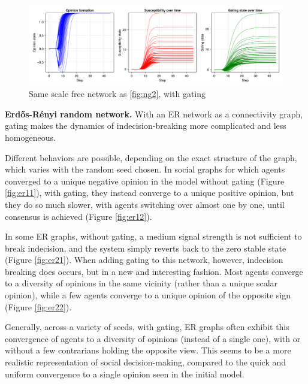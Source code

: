 \documentclass[]{article}
\begin{document}
\begin{figure}
	\centering
	\includegraphics[width=0.75\linewidth]{../plots/nvar0_wg_homd_hisig_g05_BA3_a2_taux5_s92391}
	\caption{Same scale free network as \ref{fig:ng2}, with gating}
	\label{fig:ba}
\end{figure}

\textbf{Erdős-Rényi random network.} With an ER network as a connectivity graph, gating makes the dynamics of indecision-breaking more complicated and less homogeneous. 

Different behaviors are possible, depending on the exact structure of the graph, which varies with the random seed chosen. In social graphs for which agents converged to a unique negative opinion in the model without gating (Figure \ref{fig:er11}), with gating, they instead converge to a unique positive opinion, but they do so much slower, with agents switching over almost one by one, until consensus is achieved (Figure \ref{fig:er12}).

In some ER graphs, without gating, a medium signal strength is not sufficient to break indecision, and the system simply reverts back to the zero stable state (Figure \ref{fig:er21}). When adding gating to this network, however, indecision breaking does occurs, but in a new and interesting fashion. Most agents converge to a diversity of opinions in the same vicinity (rather than a unique scalar opinion), while a few agents converge to a unique opinion of the opposite sign (Figure \ref{fig:er22}).

Generally, across a variety of seeds, with gating, ER graphs often exhibit this convergence of agents to a diversity of opinions (instead of a single one), with or without a few contrarians holding the opposite view. This seems to be a more realistic representation of social decision-making, compared to the quick and uniform convergence to a single opinion seen in the initial model.
\end{document}
